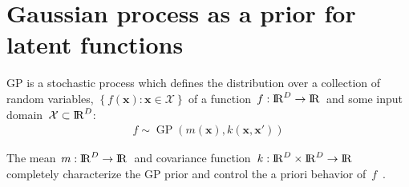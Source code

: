 \documentclass[landscape,a1,final]{a0poster} %
\let\tempone\itemize
\let\temptwo\enditemize
\renewenvironment{itemize}{\tempone\addtolength{\itemsep}{-0.3\baselineskip}}{\temptwo}
\DeclareMathOperator{\GP}{GP}
\begin{document}
\begin{minipage}{1\linewidth}
\begin{minipage}[t]{0.31\linewidth}
%
%
%


\vspace{-0.7cm}
\section{Gaussian process as a prior for latent functions}
\vspace{-0.2cm}

\begin{itemize}\setlength\itemsep{3mm}
\item GP is a {\color{navyblue} stochastic process} which defines the distribution over a collection of random variables, $\left\lbrace  f(\bm{x}): \bm{x} \in \mathcal{X}\right\rbrace$ of a function\, $f:{\rm I\!R}^D \to {\rm I\!R}$\, and some input domain\, $\mathcal{X} \subset {\rm I\!R}^D$:
%
\begin{align*}
f \sim \GP(m(\bm{x}), k(\bm{x}, \bm{x}'))
\end{align*}
%
\item The {\color{navyblue}mean}\, $m: {\rm I\!R}^D \to {\rm I\!R}$\, and {\color{navyblue}covariance function}\, $k: {\rm I\!R}^D \times {\rm I\!R}^D \to {\rm I\!R}$\, completely characterize the GP prior and control the a priori behavior of\, $f$\, \cite{rasmussen2006gaussian}.


\end{itemize}
\end{minipage}
\end{minipage}
\end{document}
